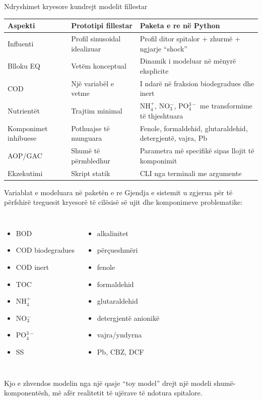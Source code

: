 \documentclass[aspectratio=169]{beamer}
\begin{document}
\begin{frame}{Ndryshimet kryesore kundrejt modelit fillestar}
\small
\begin{tabular}{>{\RaggedRight\arraybackslash}p{} >{\RaggedRight\arraybackslash}p{} >{\RaggedRight\arraybackslash}p{}}
\toprule
Aspekti & Prototipi fillestar & Paketa e re në Python \\
\midrule
Influenti & Profil sinusoidal idealizuar & Profil ditor spitalor + zhurmë + ngjarje ``shock'' \\
Blloku EQ & Vetëm konceptual & Dinamik i modeluar në mënyrë eksplicite \\
COD & Një variabël e vetme & I ndarë në fraksion biodegradues dhe inert \\
Nutrientët & Trajtim minimal & NH$_4^+$, NO$_3^-$, PO$_4^{3-}$ me transformime të thjeshtuara \\
Komponimet inhibuese & Pothuajse të munguara & Fenole, formaldehid, glutaraldehid, detergjentë, vajra, Pb \\
AOP/GAC & Shumë të përmbledhur & Parametra më specifikë sipas llojit të komponimit \\
Ekzekutimi & Skript statik & CLI nga terminali me argumente \\
\bottomrule
\end{tabular}
\end{frame}

\begin{frame}{Variablat e modeluara në paketën e re}
\justifying
Gjendja e sistemit u zgjerua për të përfshirë treguesit kryesorë të cilësisë së ujit dhe komponimeve problematike:
\begin{columns}[T]
\begin{itemize}
    \item BOD
    \item COD biodegradues
    \item COD inert
    \item TOC
    \item NH$_4^+$
    \item NO$_3^-$
    \item PO$_4^{3-}$
    \item SS
\end{itemize}
\begin{itemize}
    \item alkalinitet
    \item përçueshmëri
    \item fenole
    \item formaldehid
    \item glutaraldehid
    \item detergjentë anionikë
    \item vajra/yndyrna
    \item Pb, CBZ, DCF
\end{itemize}
\end{columns}
\vspace{0.5em}
Kjo e zhvendos modelin nga një qasje ``toy model'' drejt një \alert{modeli shumë-komponentësh}, më afër realitetit të ujërave të ndotura spitalore.
\end{frame}
\end{document}
